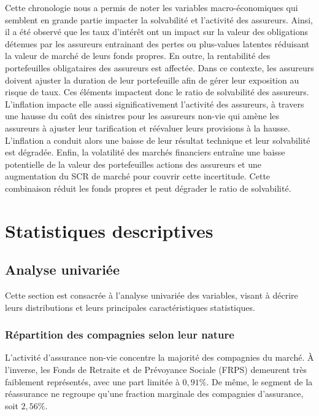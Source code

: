 \documentclass[
]{article}
\begin{document}
Cette chronologie nous a permis de noter les variables macro-économiques
qui semblent en grande partie impacter la solvabilité et l'activité des
assureurs. Ainsi, il a été observé que les taux d'intérêt ont un impact
sur la valeur des obligations détenues par les assureurs entrainant des
pertes ou plus-values latentes réduisant la valeur de marché de leurs
fonds propres. En outre, la rentabilité des portefeuilles obligataires
des assureurs est affectée. Dans ce contexte, les assureurs doivent
ajuster la duration de leur portefeuille afin de gérer leur exposition
au risque de taux. Ces éléments impactent donc le ratio de solvabilité
des assureurs. L'inflation impacte elle aussi significativement
l'activité des assureurs, à travers une hausse du coût des sinistres
pour les assureurs non-vie qui amène les assureurs à ajuster leur
tarification et réévaluer leurs provisions à la hausse. L'inflation a
conduit alors une baisse de leur résultat technique et leur solvabilité
est dégradée. Enfin, la volatilité des marchés financiers entraîne une
baisse potentielle de la valeur des portefeuilles actions des assureurs
et une augmentation du SCR de marché pour couvrir cette incertitude.
Cette combinaison réduit les fonds propres et peut dégrader le ratio de
solvabilité.

\section{Statistiques descriptives}\label{statistiques-descriptives}

\subsection{Analyse univariée}\label{analyse-univariuxe9e}

Cette section est consacrée à l'analyse univariée des variables, visant
à décrire leurs distributions et leurs principales caractéristiques
statistiques.

\subsubsection{Répartition des compagnies selon leur
nature}\label{ruxe9partition-des-compagnies-selon-leur-nature}

L'activité d'assurance non-vie concentre la majorité des compagnies du
marché. À l'inverse, les Fonds de Retraite et de Prévoyance Sociale
(FRPS) demeurent très faiblement représentés, avec une part limitée à
\(0,91 \%\). De même, le segment de la réassurance ne regroupe qu'une
fraction marginale des compagnies d'assurance, soit \(2,56 \%\).
\end{document}
